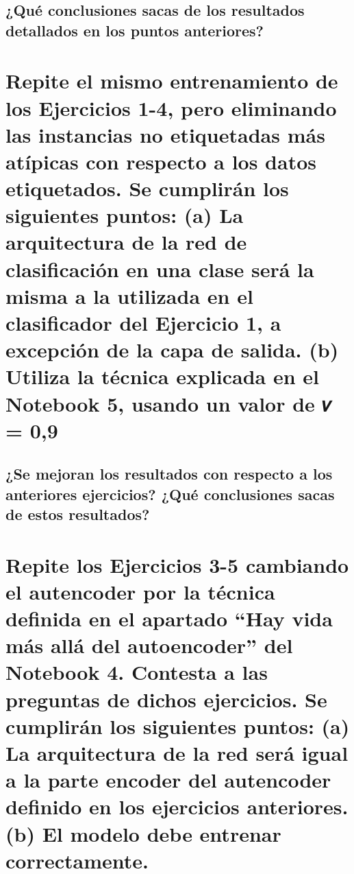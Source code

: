 \documentclass{article}
\begin{document}
\subsection{¿Qué conclusiones sacas de los resultados detallados en los puntos anteriores?}

\newpage
\section{Repite el mismo entrenamiento de los Ejercicios 1-4, pero eliminando las instancias no etiquetadas más atípicas con respecto a los datos etiquetados. Se cumplirán los siguientes puntos: (a) La arquitectura de la red de clasificación en una clase será la misma a la utilizada en el clasificador del Ejercicio 1, a excepción de la capa de salida. (b) Utiliza la técnica explicada en el Notebook 5, usando un valor de 𝑣 = 0,9}
\subsection{¿Se mejoran los resultados con respecto a los anteriores ejercicios? ¿Qué conclusiones sacas de estos resultados?}

\newpage
\section{Repite los Ejercicios 3-5 cambiando el autencoder por la técnica definida en el apartado ``Hay vida más allá del autoencoder'' del Notebook 4. Contesta a las preguntas de dichos ejercicios. Se cumplirán los siguientes puntos: (a) La arquitectura de la red será igual a la parte encoder del autencoder definido en los ejercicios anteriores. (b) El modelo debe entrenar correctamente.}
\end{document}

